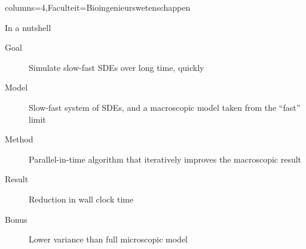 \documentclass[landscape,a0paper,fontscale=0.45]{kuleuvenposter}
\begin{document}
\begin{poster}{columns=4,Faculteit=Bioingenieurswetenschappen}
%
\begin{posterbox}%
[name=micro-macro modelling, column=0, row=0, boxColorOne=KULeuvenFaculteit!15!white, borderColor=KULeuvenFaculteit]%
{In a nutshell}%
\begin{description}
\item[Goal] Simulate slow-fast SDEs over long time, quickly
\item[Model] Slow-fast system of SDEs, and a macroscopic model taken from the ``fast'' limit
\item[Method] Parallel-in-time algorithm that iteratively improves the macroscopic result
\item[Result] Reduction in wall clock time
\item[Bonus] Lower variance than full microscopic model
\end{description}
\end{posterbox}


\end{poster}
\end{document}
